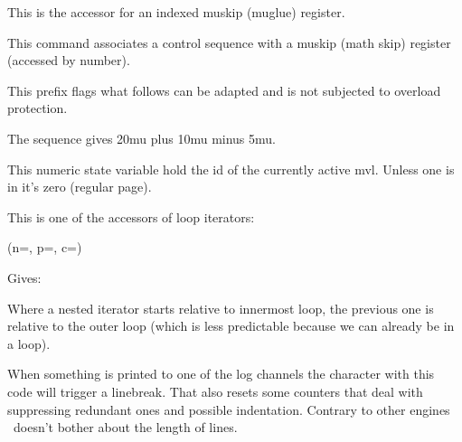 This is the accessor for an indexed muskip (muglue) register.

\stopoldprimitive

\startoldprimitive[title={\prm {muskipdef}}]

This command associates a control sequence with a muskip (math skip) register
(accessed by number).

\stopoldprimitive

\startnewprimitive[title={\prm {mutable}}]

This prefix flags what follows can be adapted and is not subjected to overload
protection.

\stopnewprimitive

\startoldprimitive[title={\prm {mutoglue}}]

The sequence  gives \the \mutoglue
20mu plus 10mu minus 5mu.

\stopoldprimitive

\startnewprimitive[title={\prm {mvlcurrentlyactive}}]

This numeric state variable hold the id of the currently active mvl. Unless one
is in  it's zero (regular page).

\stopnewprimitive

\startnewprimitive[title={\prm {nestedloopiterator}}]

This is one of the accessors of loop iterators:

\startbuffer
{} {%
     {%
        (n=\the{},
         p=\the{},
         c=\the\currentloopiterator)
    }%
}%
\stopbuffer

\typebuffer

Gives:

\getbuffer

Where a nested iterator starts relative to innermost loop, the previous one is
relative to the outer loop (which is less predictable because we can already be
in a loop).

\stopnewprimitive

\startoldprimitive[title={\prm {newlinechar}}]

When something is printed to one of the log channels the character with this code
will trigger a linebreak. That also resets some counters that deal with
suppressing redundant ones and possible indentation. Contrary to other engines
\LUAMETATEX\ doesn't bother about the length of lines.

